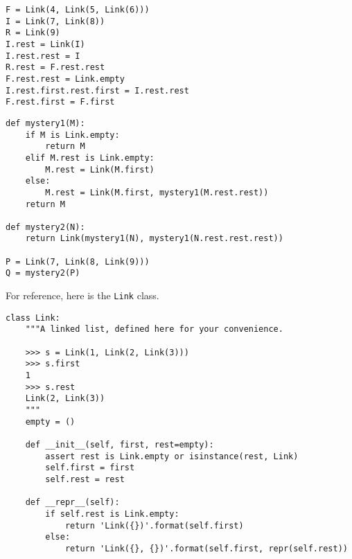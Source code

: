 \documentclass[twoside]{article}
\begin{document}
\begin{enumerate}
\vspace{1in}

\begin{verbatim}
F = Link(4, Link(5, Link(6)))
I = Link(7, Link(8))
R = Link(9)
I.rest = Link(I)
I.rest.rest = I
R.rest = F.rest.rest
F.rest.rest = Link.empty
I.rest.first.rest.first = I.rest.rest
F.rest.first = F.first
\end{verbatim}

\vspace{2.5in}

\begin{verbatim}
def mystery1(M):
    if M is Link.empty:
        return M
    elif M.rest is Link.empty:
        M.rest = Link(M.first)
    else:
        M.rest = Link(M.first, mystery1(M.rest.rest))
    return M

def mystery2(N):
    return Link(mystery1(N), mystery1(N.rest.rest.rest))

P = Link(7, Link(8, Link(9)))
Q = mystery2(P)
\end{verbatim}

\vspace{1.5in}

\newpage

For reference, here is the \lstinline{Link} class.

\begin{verbatim}
class Link:
    """A linked list, defined here for your convenience.

    >>> s = Link(1, Link(2, Link(3)))
    >>> s.first
    1
    >>> s.rest
    Link(2, Link(3))
    """
    empty = ()

    def __init__(self, first, rest=empty):
        assert rest is Link.empty or isinstance(rest, Link)
        self.first = first
        self.rest = rest

    def __repr__(self):
        if self.rest is Link.empty:
            return 'Link({})'.format(self.first)
        else:
            return 'Link({}, {})'.format(self.first, repr(self.rest))
\end{verbatim}

\end{enumerate}
\end{document}
